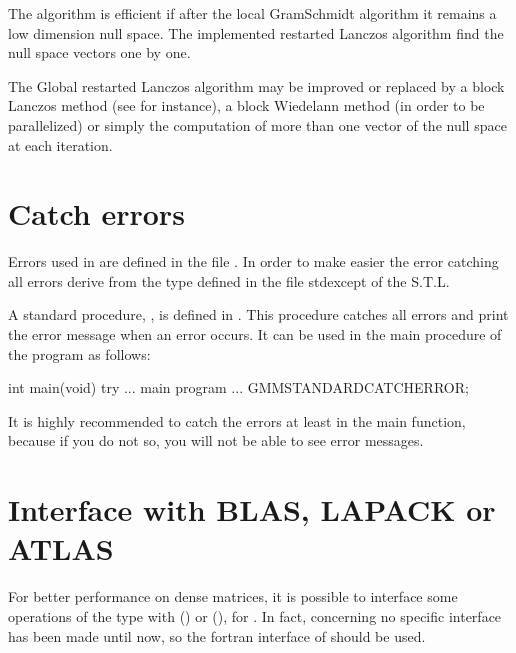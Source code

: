 \documentclass[a4paper,11pt,english]{sphinxmanual}
\begin{document}
\sphinxAtStartPar
The algorithm is efficient if after the local Gram\sphinxhyphen{}Schmidt algorithm it remains a low dimension null space. The implemented restarted Lanczos algorithm find the null space vectors one by one.

\sphinxAtStartPar
The Global restarted Lanczos algorithm may be improved or replaced by
a block Lanczos method (see  for instance), a block
Wiedelann method (in order to be parallelized) or simply
the computation of more than one vector of the null space at each
iteration.


\chapter{Catch errors}
\label{\detokenize{gmm/catch:catch-errors}}\label{\detokenize{gmm/catch:gmm-catch}}\label{\detokenize{gmm/catch::doc}}
\sphinxAtStartPar
Errors used in  are defined in the file . In order to make easier  the error catching all errors derive from the type  defined in the file \textasciigrave{}\textasciigrave{} stdexcept\textasciigrave{}\textasciigrave{} of the S.T.L.

\sphinxAtStartPar
A standard procedure, , is defined in . This procedure catches all errors and print the error message when an error occurs. It can be used in the main procedure of the program as follows:

\begin{sphinxVerbatim}[commandchars=\\\{\}]
int main(void) \PYGZob{}
  try \PYGZob{}
    ... main program ...
      \PYGZcb{}
   GMM\PYGZus{}STANDARD\PYGZus{}CATCH\PYGZus{}ERROR;
\PYGZcb{}
\end{sphinxVerbatim}

\sphinxAtStartPar
It is highly recommended to catch the errors at least in the main function, because if you do not so, you will not be able to see error messages.


\chapter{Interface with BLAS, LAPACK or ATLAS}
\label{\detokenize{gmm/blas_interface:interface-with-blas-lapack-or-atlas}}\label{\detokenize{gmm/blas_interface:gmm-lapack}}\label{\detokenize{gmm/blas_interface::doc}}
\sphinxAtStartPar
For better performance on dense matrices, it is possible to interface some operations of the type  with  () or  (), for . In fact, concerning  no specific interface has been made until now, so the fortran interface of  should be used.
\end{document}
